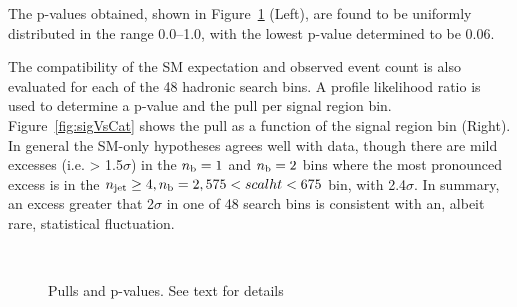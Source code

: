 The p-values obtained, shown in Figure~\ref{fig:fluct} (Left), are found 
to be uniformly distributed in the range 0.0--1.0, with the lowest p-value
determined to be 0.06.

The compatibility of the SM expectation and observed event count is
also evaluated for each of the 48 hadronic search bins. A profile
likelihood ratio is used to determine a p-value and the pull per
signal region bin. Figure~\ref{fig:sigVsCat} shows the pull as a function
of the signal region bin (Right). In general the SM-only hypotheses
agrees well with data, though there are mild excesses (i.e. > 1.5$\sigma$)
in the $n_{\text{b}} = 1$ and $n_{\text{b}} = 2$ bins where the most pronounced excess is in
the $n_{\text{jet}} \geq 4, n_{\text{b}} = 2, 575 < scalht < 675$ bin, with 2.4$\sigma$. In summary,
an excess greater that 2$\sigma$ in one of 48 search bins is consistent with 
an, albeit rare, statistical fluctuation.

\begin{figure}[h!]
  \begin{center}
     \\
    \caption{Pulls and p-values. See text for details}
    \label{fig:fluct}
  \end{center}
\end{figure}

